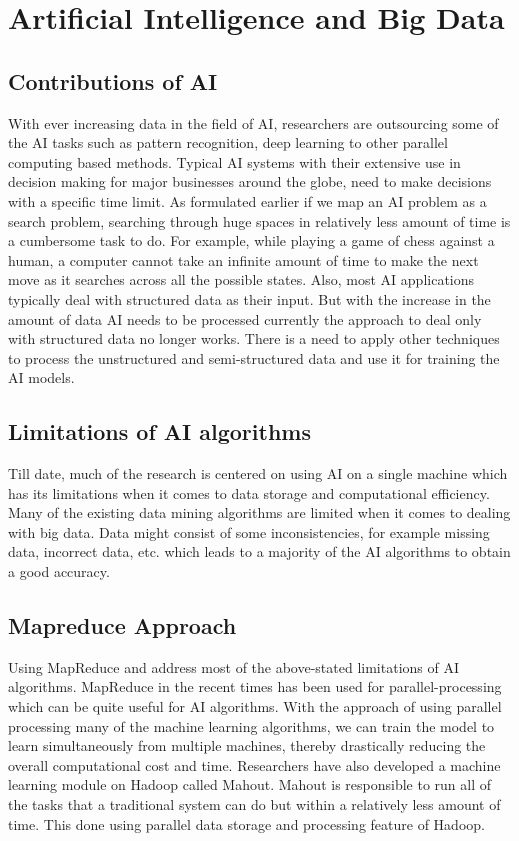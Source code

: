 \documentclass[sigconf]{acmart}
\begin{document}
\section{Artificial Intelligence and Big Data}
\subsection{Contributions of AI}
With ever increasing data in the field of AI, researchers are outsourcing some of the AI tasks such as pattern recognition, deep learning to other parallel computing based methods. Typical AI systems with their extensive use in decision making for major businesses around the globe,  need to make decisions with a specific time limit. As formulated earlier if we map an AI problem as a search problem, searching through huge spaces in relatively less amount of time is a cumbersome task to do. For example, while playing a game of chess against a human, a computer cannot take an infinite amount of time to make the next move as it searches across all the possible states. Also, most AI applications typically deal with structured data as their input. But with the increase in the amount of data AI needs to be processed currently the approach to deal only with structured data no longer works. There is a need to apply other techniques to process the unstructured and semi-structured data and use it for training the AI models.\cite{OLeary}

\subsection{Limitations of AI algorithms}
Till date, much of the research is centered on using AI on a single machine which has its limitations when it comes to data storage and computational efficiency. Many of the existing data mining algorithms are limited when it comes to dealing with big data. Data might consist of some inconsistencies, for example missing data, incorrect data, etc. which leads to a majority of the AI algorithms to obtain a good accuracy\cite{OLeary}. 

\subsection{Mapreduce Approach}

Using MapReduce and address most of the above-stated limitations of AI algorithms. MapReduce in the recent times has been used for parallel-processing which can be quite useful for AI algorithms. With the approach of using parallel processing many of the machine learning algorithms, we can train the model to learn simultaneously from multiple machines, thereby drastically reducing the overall computational cost and time. Researchers have also developed a machine learning module on Hadoop called Mahout. Mahout is responsible to run all of the tasks that a traditional system can do but within a relatively less amount of time. This done using parallel data storage and processing feature of Hadoop.\cite{OLeary}
\end{document}
